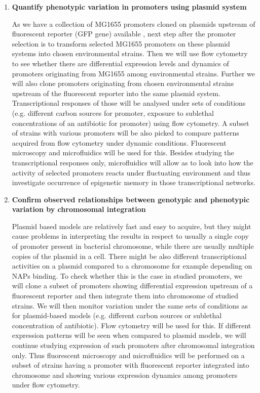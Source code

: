 \begin{enumerate}[font=\bfseries]
\begin{enumerate}[font=\bfseries]
		\item \textbf{Quantify phenotypic variation in promoters using plasmid system}
		
		As we have a collection of MG1655 promoters cloned on plasmids upstream of fluorescent reporter (GFP gene) available \cite{zaslaver2006comprehensive}, next step after the promoter selection is to transform selected MG1655 promoters on these plasmid systems into chosen environmental  strains.
		Then we will use flow cytometry to see whether there are differential expression levels and dynamics of promoters originating from MG1655 among environmental strains.
		Further we will also clone promoters originating from chosen environmental strains upstream of the fluorescent reporter into the same plasmid system.
		Transcriptional responses of those will be analysed under sets of conditions (e.g. different carbon sources for  promoter, exposure to sublethal concentrations of an antibiotic for  promoter) using flow cytometry.
		A subset of strains with various promoters will be also picked to compare patterns acquired from flow cytometry under dynamic conditions.
		Fluorescent microscopy and microfluidics will be used for this.
		Besides studying the transcriptional responses only, microfluidics will allow as to look into how the activity of selected promoters reacts under fluctuating environment and thus investigate occurrence of epigenetic memory in those transcriptional networks.
		

		\item \textbf{Confirm observed relationships between genotypic and phenotypic variation by chromosomal integration}
		
		Plasmid based models are relatively fast and easy to acquire, but they might cause problems in interpreting the results in respect to usually a single copy of promoter present in bacterial chromosome, while there are usually multiple copies of the plasmid in a cell.
		There might be also different transcriptional activities on a plasmid compared to a chromosome for example depending on NAPs binding.
		To check whether this is the case in studied promoters, we will clone a subset of promoters showing differential expression upstream of a fluorescent reporter and then integrate them into chromosome of studied strains.
		We will then monitor variation under the same sets of conditions as for plasmid-based models (e.g. different carbon sources or sublethal concentration of antibiotic).
		Flow cytometry will be used for this.
		If different expression patterns will be seen when compared to plasmid models, we will continue studying expression of such promoters after chromosomal integration only.
		Thus fluorescent microscopy and microfluidics will be performed on a subset of strains having a promoter with fluorescent reporter integrated into chromosome and showing various expression dynamics among promoters under flow cytometry.


\end{enumerate}
\end{enumerate}
